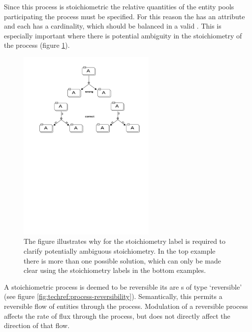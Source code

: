 Since this process is stoichiometric the relative quantities of the
entity pools participating the process must be specified. For this
reason the  has an  attribute
and each  has a cardinality, which should be
balanced in a valid \PDm. This is especially important where there is
potential ambiguity in the stoichiometry of the process (figure \ref{fig:techref:prod-card}).



\begin{figure}[htb]
  \centering
  \includegraphics[width=0.6\textwidth]{examples/stoichEx1}
  \caption{The figure illustrates why for the stoichiometry label is
    required to clarify potentially ambiguous stoichiometry. In the
    top example there is more than one possible solution, which can
    only be made clear using the stoichiometry labels in the bottom examples.}
  \label{fig:techref:prod-card}
\end{figure}



\label{sec:techref: semantics reversible procs}

A stoichiometric process is deemed to be reversible its
 are s of type `reversible' (see
figure \ref{fig:techref:process-reversibility}).  Semantically, this permits a
reversible flow of entities through the process.  Modulation of a
reversible process affects the rate of flux through the process, but
does not directly affect the direction of that flow.

